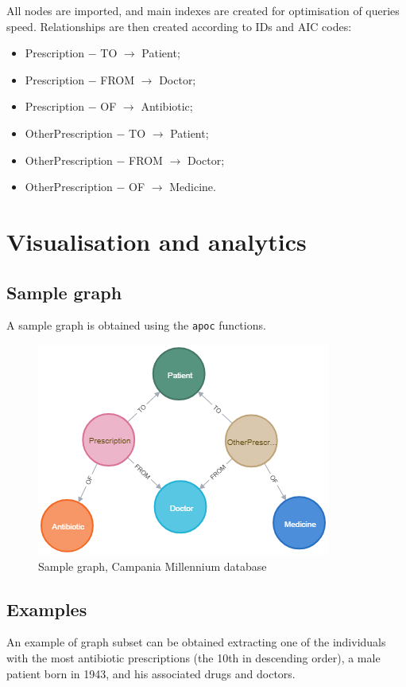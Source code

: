 All nodes are imported, and main indexes are created for optimisation of queries speed. Relationships are then created according to IDs and AIC codes:
\begin{itemize}
	\item Prescription $-$ TO $\rightarrow$ Patient;
	\item Prescription $-$ FROM $\rightarrow$ Doctor;
	\item Prescription $-$ OF $\rightarrow$ Antibiotic;
	\item OtherPrescription $-$ TO $\rightarrow$ Patient;
	\item OtherPrescription $-$ FROM $\rightarrow$ Doctor;
	\item OtherPrescription $-$ OF $\rightarrow$ Medicine.
\end{itemize}

\section{Visualisation and analytics}
\subsection{Sample graph}
A sample graph is obtained using the \texttt{apoc} functions.

\begin{figure}[h]
	\centering
	\includegraphics[scale=0.5]{./images/sample-graph.png}
	\caption{\small Sample graph, Campania Millennium database}
\end{figure}

\subsection{Examples}
An example of graph subset can be obtained extracting one of the individuals with the most antibiotic prescriptions (the 10th in descending order), a male patient born in 1943, and his associated drugs and doctors.

